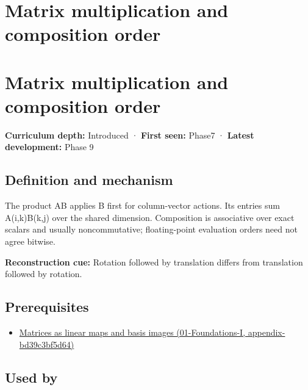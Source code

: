\hypertarget{appendix-ab31ef447dbf}{}
\section*{Matrix multiplication and composition order}
\section{Matrix multiplication and composition order}\label{appendix-ab31ef447dbf-matrix-multiplication-and-composition-order}

\textbf{Curriculum depth:} Introduced · \textbf{First seen:} Phase7 · \textbf{Latest development:} Phase 9

\subsection{Definition and mechanism}\label{appendix-ab31ef447dbf-definition-and-mechanism}

The product AB applies B first for column-vector actions. Its entries sum A(i,k)B(k,j) over the shared dimension. Composition is associative over exact scalars and usually noncommutative; floating-point evaluation orders need not agree bitwise.

\textbf{Reconstruction cue:} Rotation followed by translation differs from translation followed by rotation.

\subsection{Prerequisites}\label{appendix-ab31ef447dbf-prerequisites}

\begin{itemize}
\tightlist
\item
  \href{../01-Foundations-I/main.pdf\#nameddest=appendix-bd39c3bf5d64}{Matrices as linear maps and basis images (01-Foundations-I, appendix-bd39c3bf5d64)}
\end{itemize}

\subsection{Used by}\label{appendix-ab31ef447dbf-used-by}

